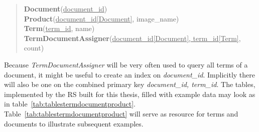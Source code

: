 \begin{quote}
    \textbf{Document}{(\underline{document\_id})}\\
    \textbf{Product}{(\underline{document\_id[Document]}, image\_name)}\\
    \textbf{Term}{(\underline{term\_id}, name)}\\
    \textbf{TermDocumentAssigner}{(\underline{document\_id[Document], term\_id[Term]}, count)}\\
\end{quote}

Because \textit{TermDocumentAssigner} will be very often used to query all terms of a document, it might be useful to create an index on \textit{document\_id}.
Implicitly there will also be one on the combined primary key \textit{document\_id, term\_id}.
The tables, implemented by the RS built for this thesis, filled with example data may look as in table~\ref{tab:tablestermdocumentproduct}.
Table~\ref{tab:tablestermdocumentproduct} will serve as resource for terms and documents to illustrate subsequent examples.

